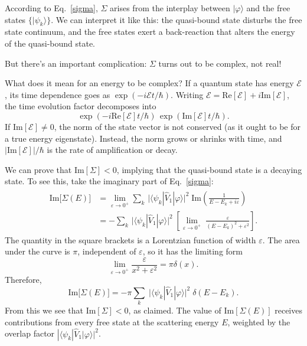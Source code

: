 \documentclass[pra,12pt]{revtex4}
\begin{document}
According to Eq.~\eqref{sigma}, $\Sigma$ arises from the interplay
between $|\varphi\rangle$ and the free states $\{|\psi_k\rangle\}$.
We can interpret it like this: the quasi-bound state disturbs the free
state continuum, and the free states exert a back-reaction that alters
the energy of the quasi-bound state.

But there's an important complication: $\Sigma$ turns out to be
complex, not real!

What does it mean for an energy to be complex?  If a quantum state has
energy $\mathcal{E}$, its time dependence goes as $\exp(-i\mathcal{E}
t/\hbar)$.  Writing $\mathcal{E} = \mathrm{Re}[\mathcal{E}] + i
\mathrm{Im}[\mathcal{E}]$, the time evolution factor decomposes into
\begin{equation*}
  \exp(-i\mathrm{Re}[\mathcal{E}] t/\hbar) \,\exp(\mathrm{Im}[\mathcal{E}] t/\hbar).
\end{equation*}
If $\mathrm{Im}[\mathcal{E}] \ne 0$, the norm of the state vector is
not conserved (as it ought to be for a true energy eigenstate).
Instead, the norm grows or shrinks with time, and
$\big|\mathrm{Im}[\mathcal{E}]\big|/\hbar$ is the rate of
amplification or decay.

We can prove that $\mathrm{Im}[\Sigma] < 0$, implying that the
quasi-bound state is a decaying state.  To see this, take the
imaginary part of Eq.~\eqref{sigma}:
\begin{align}
  \begin{aligned}\mathrm{Im}\big[\Sigma(E)\big] &= \lim_{\varepsilon\rightarrow0^+} \sum_k\, \Big| \langle\psi_k| \hat{V}_1|\varphi\rangle\Big|^2 \; \mathrm{Im}\left( \frac{1}{\displaystyle E-E_k+i\varepsilon}\right) \\ &= - \sum_k\, \Big| \langle\psi_k| \hat{V}_1|\varphi\rangle\Big|^2 \; \left[ \lim_{\varepsilon\rightarrow0^+} \; \frac{\varepsilon}{\displaystyle (E-E_k)^2 + \varepsilon^2}\right].\end{aligned}
\end{align}
The quantity in the square brackets is a Lorentzian function of
width $\varepsilon$.  The area under the curve is $\pi$, independent
of $\varepsilon$, so it has the limiting form
\begin{equation}
  \lim_{\varepsilon\rightarrow 0^+} \frac{\varepsilon}{x^2+\varepsilon^2} = \pi\delta(x).
\end{equation}
Therefore,
\begin{equation}
  \mathrm{Im}\big[\Sigma(E)\big]
  = - \pi \sum_k \; \big| \langle\psi_k| \hat{V}_1|\varphi\rangle\big|^2
  \; \delta(E-E_k).
  \label{fermigr1}
\end{equation}
From this we see that $\mathrm{Im}[\Sigma] < 0$, as claimed.  The
value of $\mathrm{Im}[\Sigma(E)]$ receives contributions from every
free state at the scattering energy $E$, weighted by the overlap
factor $| \langle\psi_k| \hat{V}_1|\varphi\rangle|^2$.
\end{document}
